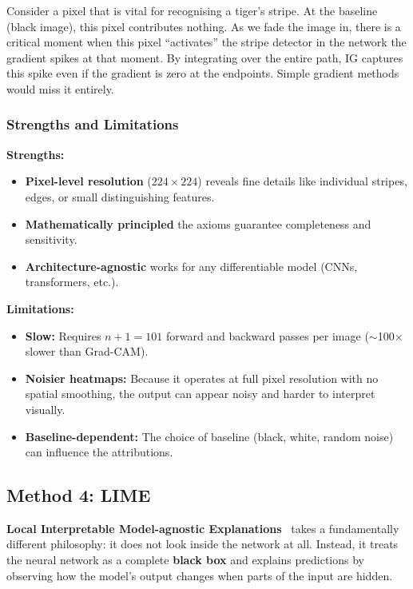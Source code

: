 \documentclass[12pt, a4paper]{article}
\begin{document}
Consider a pixel that is vital for recognising a tiger's stripe.  At the
baseline (black image), this pixel contributes nothing.  As we fade the image
in, there is a critical moment when this pixel ``activates'' the stripe
detector in the network the gradient spikes at that moment.  By integrating
over the entire path, IG captures this spike even if the gradient is zero at
the endpoints.  Simple gradient methods would miss it entirely.

\subsubsection{Strengths and Limitations}

\textbf{Strengths:}
\begin{itemize}[leftmargin=*]
    \item \textbf{Pixel-level resolution} ($224 \times 224$) reveals fine
          details like individual stripes, edges, or small distinguishing
          features.
    \item \textbf{Mathematically principled} the axioms guarantee
          completeness and sensitivity.
    \item \textbf{Architecture-agnostic} works for any differentiable
          model (CNNs, transformers, etc.).
\end{itemize}

\textbf{Limitations:}
\begin{itemize}[leftmargin=*]
    \item \textbf{Slow:} Requires $n + 1 = 101$ forward and backward passes
          per image ($\sim$100$\times$ slower than Grad-CAM).
    \item \textbf{Noisier heatmaps:} Because it operates at full pixel
          resolution with no spatial smoothing, the output can appear noisy
          and harder to interpret visually.
    \item \textbf{Baseline-dependent:} The choice of baseline (black, white,
          random noise) can influence the attributions.
\end{itemize}


\subsection{Method 4: LIME}

\textbf{Local Interpretable Model-agnostic Explanations}~\cite{ribeiro2016lime}
takes a fundamentally different philosophy: it does not look inside the network
at all.  Instead, it treats the neural network as a complete \textbf{black box}
and explains predictions by observing how the model's output changes when parts
of the input are hidden.
\end{document}
